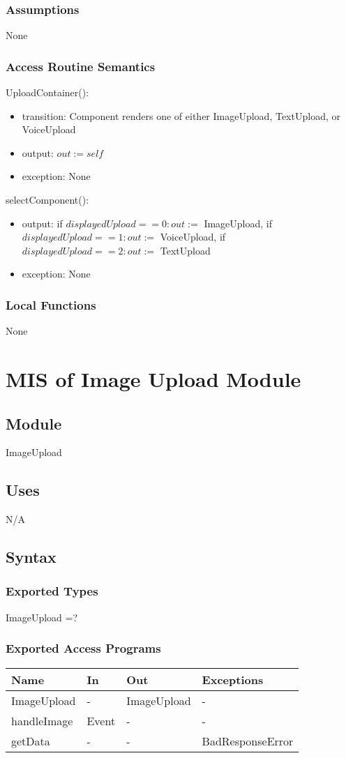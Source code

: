 \documentclass[12pt, titlepage]{article}
\begin{document}
\subsubsection{Assumptions}
None
\subsubsection{Access Routine Semantics}
\noindent UploadContainer():
\begin{itemize}
	\item transition: Component renders one of either ImageUpload, TextUpload, 
	or VoiceUpload
	\item output: $out := self$
	\item exception: None
\end{itemize}

\noindent selectComponent():
\begin{itemize}
	\item output: if $displayedUpload == 0: out := $ ImageUpload, if 
	$displayedUpload == 1: out := $ VoiceUpload, if $displayedUpload == 2: out 
	:= $ TextUpload
	\item exception: None
\end{itemize}
\subsubsection{Local Functions}
None

\newpage

\section{MIS of Image Upload Module} \label{ImageUpload} 
\subsection{Module}
ImageUpload
\subsection{Uses}
N/A
\subsection{Syntax}
\subsubsection{Exported Types}
ImageUpload =?
\subsubsection{Exported Access Programs}
\begin{center}
	\begin{tabular}{p{3cm} p{4cm} p{4cm} p{3cm}}
		\hline
		\textbf{Name} & \textbf{In} & \textbf{Out} & \textbf{Exceptions} \\
		\hline
		ImageUpload & - & ImageUpload &- \\
		handleImage & Event & - & - \\
		getData & - & - & BadResponseError \\
		\hline
	\end{tabular}
\end{center}
\end{document}

